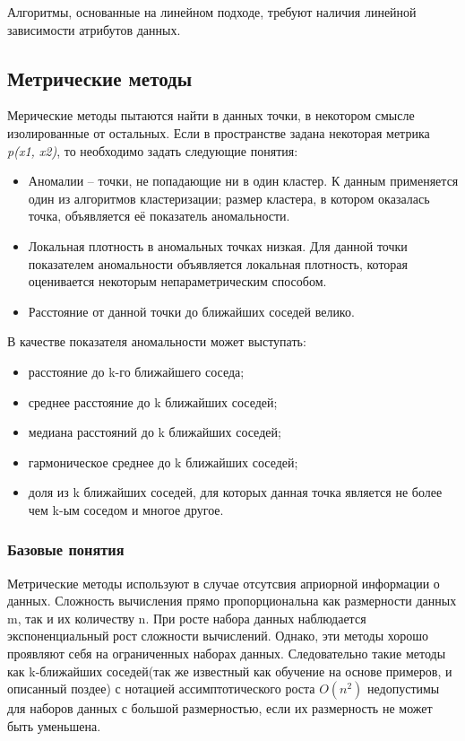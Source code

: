 Алгоритмы, основанные на линейном подходе, требуют  наличия линейной зависимости атрибутов данных. 
\subsection{Метрические методы}
Мерические методы пытаются найти в данных точки, в некотором смысле
изолированные от остальных\cite{Book01}. Если в пространстве задана некоторая метрика \textit{p(x1, x2)}, то необходимо задать следующие понятия:
\begin{itemize}
	\item  Аномалии – точки, не попадающие ни в один кластер. К данным применяется один из алгоритмов кластеризации; размер кластера, в котором оказалась точка, объявляется её показатель аномальности.
	\item Локальная плотность в аномальных точках низкая. Для данной точки показателем аномальности объявляется локальная плотность, которая оценивается некоторым непараметрическим способом.
	\item Расстояние от данной точки до ближайших соседей велико.
\end{itemize}
 В качестве показателя аномальности может выступать:
 \begin{itemize}
\item расстояние до k-го ближайшего соседа;
\item среднее расстояние до k ближайших соседей;
\item медиана расстояний до k ближайших соседей;
\item гармоническое среднее до k ближайших соседей;
\item доля из k ближайших соседей, для которых данная точка является не
более чем k-ым соседом и многое другое.
\end{itemize}
\subsubsection{Базовые понятия}
Метрические методы используют в случае отсутсвия априорной информации о данных. Сложность вычисления прямо пропорциональна как размерности данных m, так и их количеству n. При росте набора данных наблюдается экспоненциальный рост сложности вычислений. Однако, эти методы хорошо проявляют себя на ограниченных наборах данных\cite{Book07}. Следовательно такие методы как k-ближайших соседей(так же известный как обучение на основе примеров, и описанный поздее) с нотацией ассимптотического роста $O(n^2)$ недопустимы для наборов данных с большой размерностью, если их размерность не может быть уменьшена.

